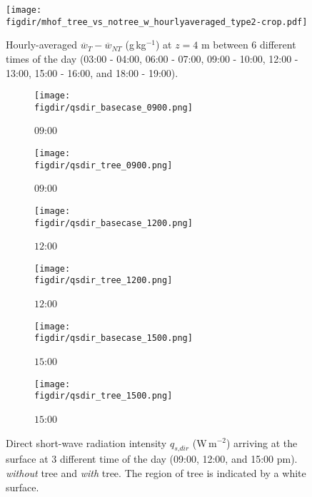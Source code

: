 \begin{figure}[t]
	\centering
	\texttt{[image: \\figdir/mhof\_tree\_vs\_notree\_w\_hourlyaveraged\_type2-crop.pdf]}
	\caption{Hourly-averaged $\overline{w}_{T}-\overline{w}_{\textit{NT}}$ (g\,kg$^{-1}$) at $z=4$ m between 6 different times of the day (03:00 - 04:00, 06:00 - 07:00, 09:00 - 10:00, 12:00 - 13:00, 15:00 - 16:00, and 18:00 - 19:00).}
	\label{fig:wdiff_muensterhof}
\end{figure}


\begin{figure}[p]
	\centering
	\begin{subfigure}[b]{.45\linewidth}
		\texttt{[image: \\figdir/qsdir\_basecase\_0900.png]}
		\caption{$09$:$00$}\label{fig:qrdir_basecase_0900}
	\end{subfigure}\hspace*{\fill}
	\begin{subfigure}[b]{.45\linewidth}
		\texttt{[image: \\figdir/qsdir\_tree\_0900.png]}
		\caption{$09$:$00$}\label{fig:qrdir_tree_0900}
	\end{subfigure}
	
	\medskip
	\begin{subfigure}[b]{.45\linewidth}
		\texttt{[image: \\figdir/qsdir\_basecase\_1200.png]}
		\caption{$12$:$00$}\label{fig:qsdir_basecase_1200}
	\end{subfigure}\hspace*{\fill}
	\begin{subfigure}[b]{.45\linewidth}
		\texttt{[image: \\figdir/qsdir\_tree\_1200.png]}
		\caption{$12$:$00$}\label{fig:qsdir_tree_1200}
	\end{subfigure}
	
	\medskip
	\begin{subfigure}[b]{.45\linewidth}
		\texttt{[image: \\figdir/qsdir\_basecase\_1500.png]}
		\caption{$15$:$00$}\label{fig:qsdir_basecase_1500}
	\end{subfigure}\hspace*{\fill}
	\begin{subfigure}[b]{.45\linewidth}
		\texttt{[image: \\figdir/qsdir\_tree\_1500.png]}
		\caption{$15$:$00$}\label{fig:qsdir_tree_1500}
	\end{subfigure}
	
	\caption{Direct short-wave radiation intensity $q_{\textit{s,dir}}$ (W\,m$^{-2}$) arriving at the surface at 3 different time of the day (09:00, 12:00, and 15:00 pm).  \textit{without} tree and  \textit{with} tree. The region of tree is indicated by a white surface. }
	\label{fig:qsdir_muensterhof}	
\end{figure}

